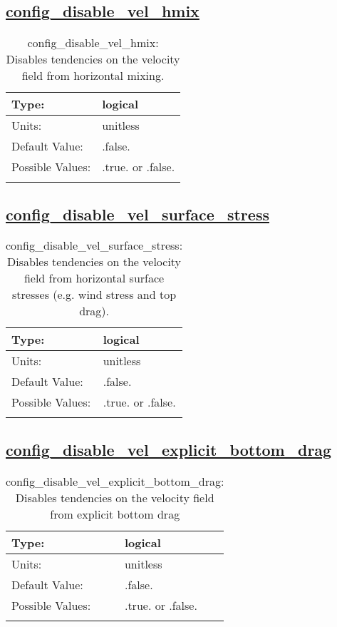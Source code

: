 \subsection[config\_disable\_vel\_hmix]{\hyperref[sec:nm_tab_debug]{config\_disable\_vel\_hmix}}
\label{subsec:nm_sec_config_disable_vel_hmix}
\begin{center}
\begin{longtable}{| p{2.0in} || p{4.0in} |}
    \hline
    Type: & logical \\
    \hline
    Units: & \si{unitless} \\
    \hline
    Default Value: & .false. \\
    \hline
    Possible Values: & .true. or .false. \\
    \hline
    \caption{config\_disable\_vel\_hmix: Disables tendencies on the velocity field from horizontal mixing.}
\end{longtable}
\end{center}
\subsection[config\_disable\_vel\_surface\_stress]{\hyperref[sec:nm_tab_debug]{config\_disable\_vel\_surface\_stress}}
\label{subsec:nm_sec_config_disable_vel_surface_stress}
\begin{center}
\begin{longtable}{| p{2.0in} || p{4.0in} |}
    \hline
    Type: & logical \\
    \hline
    Units: & \si{unitless} \\
    \hline
    Default Value: & .false. \\
    \hline
    Possible Values: & .true. or .false. \\
    \hline
    \caption{config\_disable\_vel\_surface\_stress: Disables tendencies on the velocity field from horizontal surface stresses (e.g. wind stress and top drag).}
\end{longtable}
\end{center}
\subsection[config\_disable\_vel\_explicit\_bottom\_drag]{\hyperref[sec:nm_tab_debug]{config\_disable\_vel\_explicit\_bottom\_drag}}
\label{subsec:nm_sec_config_disable_vel_explicit_bottom_drag}
\begin{center}
\begin{longtable}{| p{2.0in} || p{4.0in} |}
    \hline
    Type: & logical \\
    \hline
    Units: & \si{unitless} \\
    \hline
    Default Value: & .false. \\
    \hline
    Possible Values: & .true. or .false. \\
    \hline
    \caption{config\_disable\_vel\_explicit\_bottom\_drag: Disables tendencies on the velocity field from explicit bottom drag}
\end{longtable}
\end{center}
